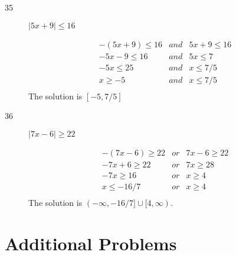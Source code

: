 \documentclass[fleqn,addpoints]{exam}
\begin{document}
\begin{description}
\item[35]

\( | 5x + 9 | \leq 16 \)

\begin{eqnarray*}
  -(5x + 9) \leq 16 &and& 5x + 9 \leq 16 \\
  -5x - 9 \leq 16 &and& 5x \leq 7 \\
  -5x \leq 25 &and& x \leq 7/5 \\
  x \geq -5 &and& x \leq 7/5 \\
\end{eqnarray*}
The solution is \( [-5, 7/5] \)

\item[36]

\( | 7x - 6 | \geq 22 \)

\begin{eqnarray*}
  -(7x - 6) \geq 22 &or& 7x - 6 \geq 22 \\
  -7x + 6 \geq 22 &or& 7x \geq 28 \\
  -7x \geq 16 &or& x \geq 4 \\
  x \leq -16/7 &or& x \geq 4 \\
\end{eqnarray*}
The solution is \( (-\infty, -16/7] \cup [4, \infty) \).

\end{description}
\fi

\section{Additional Problems}
\end{document}
